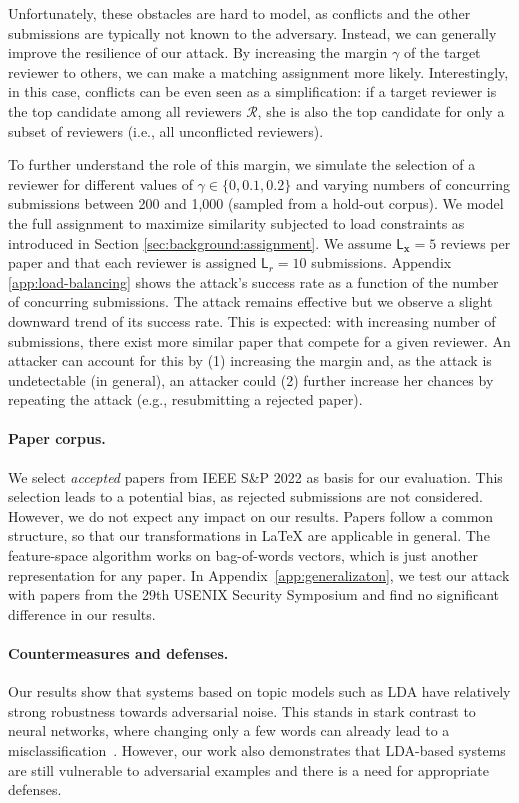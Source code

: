 \documentclass[letterpaper,twocolumn,10pt]{article}
\newcommand{\bow}{\textbf{x}}
\newcommand{\submission}{\bow}
\newcommand{\reviewersset}{\mathcal{R}}
\newcommand{\reviewer}{r}
\newcommand{\reviewerload}{\mathsf{L}_{\reviewer}}
\newcommand{\paperload}{\mathsf{L}_{\submission}}
\newcommand{\margin}{\gamma}
\begin{document}
Unfortunately, these obstacles are hard to model, as conflicts and the other submissions are typically not known to the adversary. Instead, we can generally improve the resilience of our attack. By increasing the margin $\margin$ of the target reviewer to others, we can make a matching assignment more likely. Interestingly, in this case, conflicts can be even seen as a simplification: if a target reviewer is the top candidate among all reviewers $\reviewersset$, she is also the top candidate for only a subset of reviewers (i.e., all unconflicted reviewers).

To further understand the role of this margin, we simulate the selection of a reviewer for different values of $\margin \in \{0, 0.1, 0.2\}$ and varying numbers of concurring submissions between 200 and 1,000 (sampled from a hold-out corpus). We model the full assignment to maximize similarity subjected to load constraints as introduced in Section \ref{sec:background:assignment}. We assume $\paperload = 5$ reviews per paper and that each reviewer is assigned $\reviewerload = 10$ submissions.
Appendix \ref{app:load-balancing} shows the attack's success rate as a function of the number of concurring submissions. The attack remains effective but we observe a slight downward trend of its success rate. This is expected: with increasing number of submissions, there exist more similar paper that compete for a given reviewer. An attacker can account for this by (1) increasing the margin and, as the attack is undetectable (in general), an attacker could (2) further increase her chances by repeating the attack (e.g., resubmitting a rejected paper).

\paragraph{Paper corpus.}
We select \emph{accepted} papers from IEEE S\&P 2022 as basis for our evaluation. This selection leads to a potential bias, as rejected submissions are not considered. However, we do not expect any impact on our results. Papers follow a common structure, so that our transformations in \LaTeX{} are applicable in general. The feature-space algorithm works on bag-of-words vectors, which is just another representation for any paper.
In Appendix~\ref{app:generalizaton}, we test our attack with papers from the 29th USENIX Security Symposium and find no significant difference in our results.

\paragraph{Countermeasures and defenses.}
Our results show that systems based on topic models such as \ac{LDA} have relatively strong robustness towards adversarial noise. This stands in stark contrast to neural networks, where changing only a few words can already lead to a misclassification~\cite[e.g.,][]{gao-18-blackbox, li-19-textbugger}. However, our work also demonstrates that \ac{LDA}-based systems are still vulnerable to adversarial examples and there is a need for appropriate defenses. 
\end{document}
